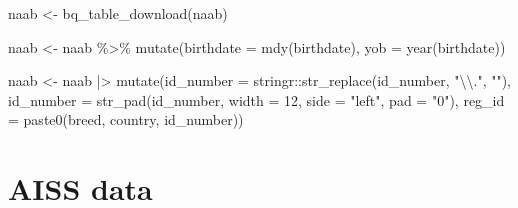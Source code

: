\documentclass[
]{article}
\newenvironment{Shaded}{\begin{snugshade}}{\end{snugshade}}
\newcommand{\AttributeTok}[1]{\textcolor[rgb]{0.77,0.63,0.00}{#1}}
\newcommand{\DecValTok}[1]{\textcolor[rgb]{0.00,0.00,0.81}{#1}}
\newcommand{\FunctionTok}[1]{\textcolor[rgb]{0.00,0.00,0.00}{#1}}
\newcommand{\NormalTok}[1]{#1}
\newcommand{\OtherTok}[1]{\textcolor[rgb]{0.56,0.35,0.01}{#1}}
\newcommand{\SpecialCharTok}[1]{\textcolor[rgb]{0.00,0.00,0.00}{#1}}
\newcommand{\StringTok}[1]{\textcolor[rgb]{0.31,0.60,0.02}{#1}}
\begin{document}
\begin{Shaded}
\begin{Highlighting}[]
\NormalTok{naab }\OtherTok{\textless{}{-}} \FunctionTok{bq\_table\_download}\NormalTok{(naab)}

\NormalTok{naab }\OtherTok{\textless{}{-}}\NormalTok{ naab }\SpecialCharTok{\%\textgreater{}\%}
  \FunctionTok{mutate}\NormalTok{(}\AttributeTok{birthdate =} \FunctionTok{mdy}\NormalTok{(birthdate),}
         \AttributeTok{yob =} \FunctionTok{year}\NormalTok{(birthdate))}

\NormalTok{naab }\OtherTok{\textless{}{-}}\NormalTok{ naab }\SpecialCharTok{|\textgreater{}}
  \FunctionTok{mutate}\NormalTok{(}\AttributeTok{id\_number =}\NormalTok{ stringr}\SpecialCharTok{::}\FunctionTok{str\_replace}\NormalTok{(id\_number, }\StringTok{"}\SpecialCharTok{\textbackslash{}\textbackslash{}}\StringTok{."}\NormalTok{, }\StringTok{""}\NormalTok{),}
         \AttributeTok{id\_number =} \FunctionTok{str\_pad}\NormalTok{(id\_number, }\AttributeTok{width =} \DecValTok{12}\NormalTok{, }\AttributeTok{side =} \StringTok{"left"}\NormalTok{, }\AttributeTok{pad =} \StringTok{"0"}\NormalTok{),}
         \AttributeTok{reg\_id =} \FunctionTok{paste0}\NormalTok{(breed, country, id\_number))}
\end{Highlighting}
\end{Shaded}

\hypertarget{aiss-data}{%
\section{AISS data}\label{aiss-data}}
\end{document}
